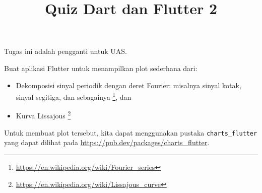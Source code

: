 \documentclass[a4paper,11pt]{article} %
\newcommand{\txtinline}[1]{\texttt{#1}}
\begin{document}
\title{Quiz Dart dan Flutter 2}
\author{}
\date{}
\maketitle


Tugas ini adalah pengganti untuk UAS.

Buat aplikasi Flutter untuk menampilkan plot sederhana dari:
\begin{itemize}
\item Dekomposisi sinyal periodik dengan deret Fourier: misalnya sinyal kotak, sinyal
segitiga, dan sebagainya \footnote{\url{https://en.wikipedia.org/wiki/Fourier_series}}, dan
\item Kurva Lissajous \footnote{\url{https://en.wikipedia.org/wiki/Lissajous_curve}}
\end{itemize}

Untuk membuat plot tersebut, kita dapat menggunakan pustaka \txtinline{charts_flutter}
yang dapat dilihat pada {\footnotesize\url{https://pub.dev/packages/charts_flutter}}.
\end{document}
